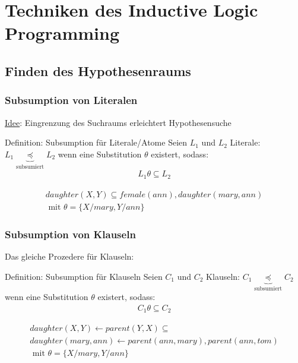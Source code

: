 \section{Techniken des Inductive Logic Programming}
\subsection{Finden des Hypothesenraums}
\begin{frame}
	\frametitle{Subsumption von Literalen}
	\underline{Idee}: Eingrenzung des Suchraums erleichtert Hypothesensuche

	\begin{block}{Definition: Subsumption für Literale/Atome}
		Seien $L_1$ und $L_2$ Literale: $L_1 \underbrace{\preceq}_{\text{subsumiert}} L_2$
		wenn eine Substitution $\theta$ existert, sodass:
		\begin{align*}
			 L_1 \theta \subseteq L_2
		\end{align*}
	\end{block}
	\begin{bsp}
		\begin{align*}
			 daughter(X, Y)  \subseteq female(ann), daughter(mary, ann)\\\text{  mit  } \theta = \{X/mary, Y/ann\}
		\end{align*}
	\end{bsp}
\end{frame}
\begin{frame}
	\frametitle{Subsumption von Klauseln}
	Das gleiche Prozedere für Klauseln:
	\begin{block}{Definition: Subsumption für Klauseln}
		Seien $C_1$ und $C_2$ Klauseln: $C_1 \underbrace{\preceq}_{\text{subsumiert}} C_2$
		wenn eine Substitution $\theta$ existert, sodass:
		\begin{align*}
			 C_1 \theta \subseteq C_2
		\end{align*}
	\end{block}
	\begin{bsp}
		\begin{gather*}
			 daughter(X, Y) \leftarrow parent(Y,X) \subseteq\\
			 daughter(mary, ann) \leftarrow parent(ann, mary), parent(ann, tom)\\
			 \text{  mit  } \theta = \{X/mary, Y/ann\}
		\end{gather*}
	\end{bsp}
\end{frame}

